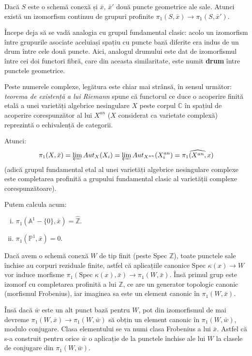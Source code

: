 \documentclass[13pt,openany]{book}
\begin{document}
\begin{cor}
Dacă $S$ este o schemă conexă și $\bar{x}$, $\bar{x}'$ două puncte geometrice ale sale. Atunci există un izomorfism continuu de grupuri profinite $\pi_1(S,\bar{x}) \rightarrow \pi_1(S,\bar{x}')$.
\end{cor}

Începe deja să se vadă analogia cu grupul fundamental clasic: acolo un izomorfism între grupurile asociate aceluiași spațiu cu puncte bază diferite era indus de un drum între cele două puncte. Aici, analogul drumului este dat de izomorfismul între cei doi functori fibră, care din aceasta similaritate, este numit {\bf drum} între punctele geometrice.

Peste numerele complexe, legătura este chiar mai strânsă, în sensul următor: {\it teorema de existență a lui Riemann} spune că functorul ce duce o acoperire finită etală a unei varietăți algebrice nesingulare $X$ peste corpul $\mathbb{C}$ în spațiul de acoperire corespunzător al lui $X^{an}$ ($X$ considerat ca varietate complexă) reprezintă o echivalență de categorii.

Atunci:
$$\pi_1(X,\bar{x}) = \varprojlim Aut_X(X_i) = \varprojlim Aut_{X^{an}}(X_i^{an}) = \widehat{\pi_1(X^{an},x)}$$
(adică grupul fundamental etal al unei varietăți algebrice nesingulare complexe este completarea profinită a grupului fundamental clasic al varietății complexe corespunzătoare).

\begin{exs}
Putem calcula acum:
\begin{enumerate}[i)]
\item $\pi_1(\mathbb{A}^1 - \{0\},\bar{x}) = \hat{\mathbb{Z}}$.

\item $\pi_1(\mathbb{P}^1,\bar{x}) = 0$.
\end{enumerate}
\end{exs}

Dacă avem o schemă conexă $W$ de tip finit (peste Spec $\mathbb{Z}$), toate punctele sale închise au corpuri reziduale finite, astfel că aplicațiile canonice Spec $\kappa(x) \rightarrow W$ vor induce morfisme $\pi_1(\text{Spec }\kappa(x),\bar{x}) \rightarrow \pi_1(W,\bar{x})$. Însă primul grup este izomorf cu completarea profinită a lui $\mathbb{Z}$, ce are un generator topologic canonic (morfismul Frobenius), iar imaginea sa este un element canonic în $ \pi_1(W,\bar{x})$.

Însă dacă $\bar{w}$ este un alt punct bază pentru $W$, pot din izomorfismul de mai devreme $ \pi_1(W,\bar{x}) \rightarrow \pi_1(W,\bar{w})$ să obțin un element canonic în $\pi_1(W,\bar{w})$, modulo conjugare. Clasa elementului se va numi clasa Frobenius a lui $\bar{x}$. Astfel că s-a construit pentru orice $\bar{w}$ o aplicație de la punctele închise ale lui $W$ la clasele de conjugare din $\pi_1(W,\bar{w})$.
\end{document}
